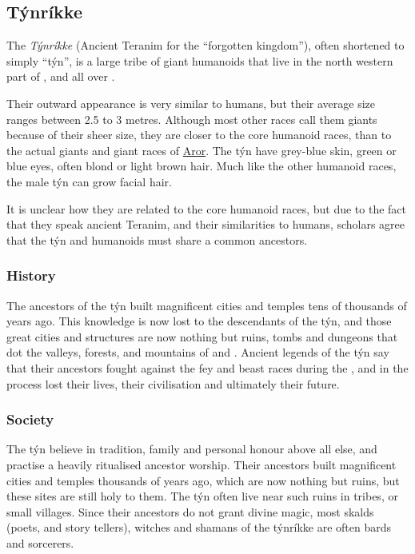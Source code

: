 \subsection{Týnríkke}
\label{sec:Tynrikke}

The \emph{Týnríkke} (Ancient Teranim for the ``forgotten kingdom''), often
shortened to simply ``týn'', is a large tribe of giant humanoids that live in
the north western part of , and all over
.

Their outward appearance is very similar to humans, but their average size
ranges between 2.5 to 3 metres. Although most other races call them giants
because of their sheer size, they are closer to the core humanoid races, than
to the actual giants and giant races of \hyperref[sec:Aror]{Aror}. The týn
have grey-blue skin, green or blue eyes, often blond or light brown hair.
Much like the other humanoid races, the male týn can grow facial hair.

It is unclear how they are related to the core humanoid races, but due to the
fact that they speak ancient Teranim, and their similarities to humans,
scholars agree that the týn and humanoids must share a common ancestors.

\subsubsection{History}

The ancestors of the týn built magnificent cities and temples tens of thousands
of years ago. This knowledge is now lost to the descendants of the týn, and
those great cities and structures are now nothing but ruins, tombs and dungeons
that dot the valleys, forests, and mountains of  and
. Ancient legends of the týn say that their ancestors
fought against the fey and beast races during the ,
and in the process lost their lives, their civilisation and ultimately their
future.

\subsubsection{Society}

The týn believe in tradition, family and personal honour above all else, and
practise a heavily ritualised ancestor worship. Their ancestors built
magnificent cities and temples thousands of years ago, which are now nothing
but ruins, but these sites are still holy to them. The týn often live near
such ruins in tribes, or small villages. Since their ancestors do not grant
divine magic, most skalds (poets, and story tellers), witches and shamans
of the týnríkke are often bards and sorcerers.


